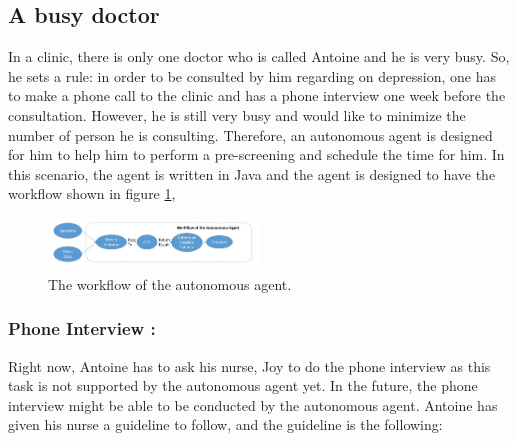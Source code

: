 \documentclass{article}
\begin{document}
	\subsection{A busy doctor}
	In a clinic, there is only one doctor who is called Antoine and he is very busy. 
	So, he sets a rule: in order to be consulted by him regarding on depression, 
	one has to make a phone call to the clinic and has a phone interview one week before the consultation. 
	However, he is still very busy and would like to minimize the number of person he is consulting. 
	Therefore, an autonomous agent is designed for him to help him to perform a pre-screening and schedule the time for him.
	In this scenario, the agent is written in Java and the agent is designed to have the workflow shown in figure \ref{figure:workflow_agent},

	\begin{figure}[h]
	    \begin{center}
		\includegraphics[width=0.5\textwidth]{workflow_agent}
	    \end{center}
	    \caption{The workflow of the autonomous agent.}
	    \label{figure:workflow_agent}
	\end{figure}
	
	\subsubsection{Phone Interview :}
	Right now, Antoine has to ask his nurse, Joy to do the phone interview as this task is not supported by the autonomous agent yet. 
	In the future, the phone interview might be able to be conducted by the autonomous agent.
	Antoine has given his nurse a guideline to follow, and the guideline is the following:
	
\end{document}
